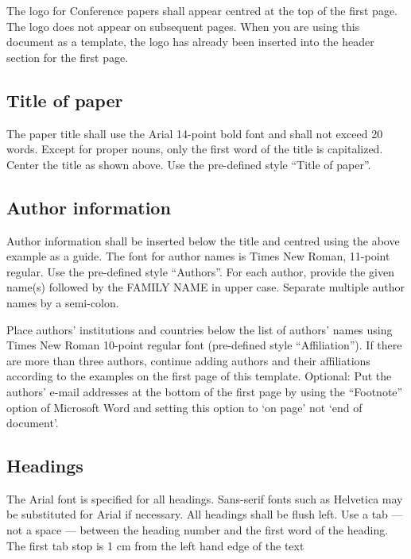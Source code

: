 The logo for Conference papers shall appear centred at the top of the first page. The logo does not appear on subsequent pages. When you are using this document as a template, the logo has already been inserted into the header section for the first page. 

\clearpage
\subsection{Title of paper}

The paper title shall use the Arial 14-point bold font and shall not exceed 20 words. Except for proper nouns, only the first word of the title is capitalized. Center the title as shown above. Use the pre-defined style ``Title of paper''.

\subsection{Author information}

Author information shall be inserted below the title and centred using the above example as a guide. The font for author names is Times New Roman, 11-point regular. Use the pre-defined style ``Authors''. For each author, provide the given name(s) followed by the FAMILY NAME in upper case. Separate multiple author names by a semi-colon.

Place authors' institutions and countries below the list of authors' names using Times New Roman 10-point regular font (pre-defined style ``Affiliation''). If there are more than three authors, continue adding authors and their affiliations according to the examples on the first page of this template.
Optional: Put the authors' e-mail addresses at the bottom of the first page by using the ``Footnote'' option of Microsoft Word and setting this option to `on page' not `end of document'.

\subsection{Headings}

The Arial font is specified for all headings. Sans-serif fonts such as Helvetica may be substituted for Arial if necessary. All headings shall be flush left. Use a tab --- not a space --- between the heading number and the first word of the heading. The first tab stop is 1 cm from the left hand edge of the text

